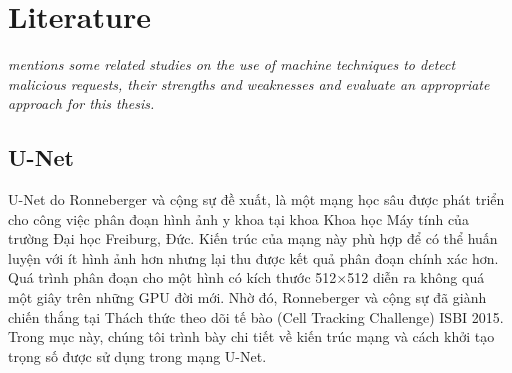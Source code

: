 \chapter{Literature}
\label{chap:literature}
	\textit{mentions some related studies on the use of machine techniques to detect malicious requests, their strengths and weaknesses and evaluate an appropriate approach for this thesis.}
	\minitoc

\section{U-Net}
\label{sec:u_net}
	U-Net do Ronneberger và cộng sự \cite{ronneberger2015u} đề xuất, là một mạng học sâu được phát triển cho công việc phân đoạn hình ảnh y khoa tại khoa Khoa học Máy tính của trường Đại học Freiburg, Đức. Kiến trúc của mạng này phù hợp để có thể huấn luyện với ít hình ảnh hơn nhưng lại thu được kết quả phân đoạn chính xác hơn. Quá trình phân đoạn cho một hình có kích thước 512$\times$512 diễn ra không quá một giây trên những GPU đời mới. Nhờ đó, Ronneberger và cộng sự đã giành chiến thắng tại Thách thức theo dõi tế bào (Cell Tracking Challenge) ISBI 2015. Trong mục này, chúng tôi trình bày chi tiết về kiến trúc mạng và cách khởi tạo trọng số được sử dụng trong mạng U-Net.
	
